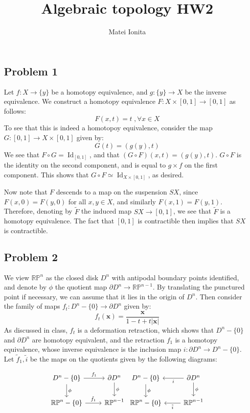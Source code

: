 \documentclass[12 pt]{article}
\title{Algebraic topology HW2}
\author{Matei Ionita}
\newcommand{\p}{\partial}
\DeclareMathOperator{\id}{Id}
\begin{document}
  \maketitle

\subsection*{Problem 1}
Let $f : X \to \{y\}$ be a homotopy equivalence, and $g: \{y\} \to X$ be the inverse equivalence. We construct a homotopy equivalence $F: X \times [0,1] \to [0,1]$ as follows:
\[        F(x, t) = t \;, \forall x \in X    \]
To see that this is indeed a homotopoy equivalence, consider the map $G: [0,1] \to X\times [0,1]$ given by:
\[      G(t) = ( g(y) , t)     \]
We see that $F \circ G = \id_{[0,1]}$, and that $(G\circ F) (x,t) = (g(y), t)$. $G\circ F$ is the identity on the second component, and is equal to $g\times f$ on the first component. This shows that $G\circ F \simeq \id_{X\times [0,1]}$, as desired.

Now note that $F$ descends to a map on the suspension $SX$, since $F(x,0) = F(y, 0)$ for all $x,y \in X$, and similarly $F(x,1) = F(y,1)$. Therefore, denoting by $\tilde F$ the induced map $SX \to [0,1]$, we see that $\tilde F$ is a homotopy equivalence. The fact that $[0,1]$ is contractible then implies that $SX$ is contractible.


\subsection*{Problem 2}
We view $\mathbb{RP}^n$ as the closed disk $D^n$ with antipodal boundary points identified, and denote by $\phi$ the quotient map $\p D^n \to \mathbb{RP}^{n-1}$. By translating the punctured point if necessary, we can assume that it lies in the origin of $D^n$. Then consider the family of maps $f_t : D^n - \{0\} \to \p D^n$ given by:
\[     f_t (\mathbf{x}) = \frac{\mathbf{x}}{1 - t + t|\mathbf{x}|}  \]
As discussed in class, $f_t$ is a deformation retraction, which shows that $D^n - \{0\}$ and $\p D^n$ are homotopy equivalent, and the retraction $f_1$ is a homotopy equivalence, whose inverse equivalence is the inclusion map $i : \p D^n \to D^n - \{0\}$. Let $\tilde f_1, \tilde i$ be the maps on the quotients given by the following diagrams:

\[ \begin{tikzcd}
D^n - \{0\}\arrow{r}{f_1}\arrow{d}{\phi} & \p D^n\arrow{d}{\phi} \\
\mathbb{RP}^n - \{0\}\arrow{r}{\tilde f_1} & \mathbb{RP}^{n-1}
\end{tikzcd} 
\begin{tikzcd}
D^n - \{0\}\arrow{d}{\phi} & \p D^n\arrow{d}{\phi}\arrow{l}{i} \\
\mathbb{RP}^n - \{0\} & \mathbb{RP}^{n-1}\arrow{l}{\tilde i}
\end{tikzcd} 
\]
\end{document}
